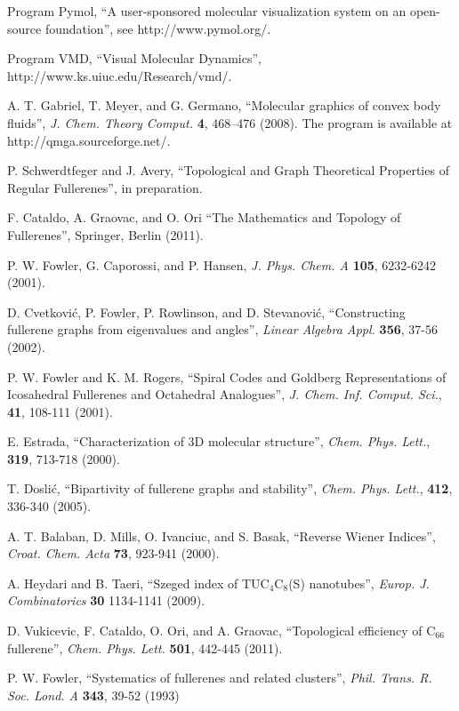 \documentclass[article,a4paper,twoside]{memoir}
\newcommand{\C}[1]{\ensuremath{\mathrm{C}_{#1}}}
\begin{document}
\begin{thebibliography}{99}
 Program Pymol, ``A user-sponsored molecular visualization system on an open-source foundation'', see http://www.pymol.org/.

 Program VMD, ``Visual Molecular Dynamics'', http://www.ks.uiuc.edu/Research/vmd/.

 A. T. Gabriel, T. Meyer, and G. Germano, 
``Molecular graphics of convex body fluids'', \textit{J. Chem. Theory Comput.}
\textbf{4}, 468--476 (2008). The program is available at http://qmga.sourceforge.net/.

 P. Schwerdtfeger and J. Avery, ``Topological and Graph Theoretical Properties of Regular Fullerenes'', in preparation.

 F. Cataldo, A. Graovac, and O. Ori ``The Mathematics and Topology of Fullerenes'', Springer, Berlin (2011).

 P. W. Fowler, G. Caporossi, and P. Hansen, \textit{J. Phys. Chem. A} \textbf{105}, 6232-6242 (2001).

 D. Cvetkovi\'c, P. Fowler, P. Rowlinson, and D. Stevanovi\'c, ``Constructing fullerene graphs from eigenvalues and angles'',
\textit{Linear Algebra Appl.} \textbf{356}, 37-56 (2002).

 P. W. Fowler and K. M. Rogers, ``Spiral Codes and Goldberg Representations of Icosahedral Fullerenes and Octahedral
Analogues'', \textit{J. Chem. Inf. Comput. Sci.}, \textbf{41}, 108-111 (2001).

 E. Estrada, ``Characterization of 3D molecular structure'', \textit{Chem. Phys. Lett.}, \textbf{319}, 713-718 (2000).

 T. Dosli\'c, ``Bipartivity of fullerene graphs and stability'', \textit{Chem. Phys. Lett.}, \textbf{412}, 336-340 (2005).

 A. T. Balaban, D. Mills, O. Ivanciuc, and S. Basak, ``Reverse Wiener Indices'', \textit{Croat. Chem. Acta} \textbf{73}, 923-941 (2000).

 A. Heydari and B. Taeri, ``Szeged index of TUC$_4$C$_8$(S) nanotubes'', \textit{Europ. J. Combinatorics} \textbf{30} 1134-1141 (2009). 

 D. Vukicevic, F. Cataldo, O. Ori, and A. Graovac, ``Topological efficiency of \C{66} fullerene'', \textit{Chem. Phys. Lett.} \textbf{501}, 442-445 (2011).

 P. W. Fowler, ``Systematics of fullerenes and related clusters'', \textit{Phil. Trans. R. Soc. Lond. A} \textbf{343}, 39-52 (1993) 


\end{thebibliography}
\end{document}
